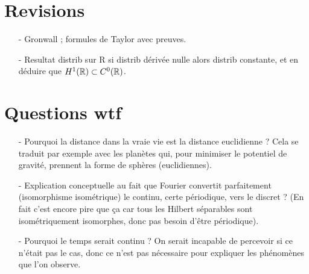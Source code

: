 \documentclass[11pt,a4paper]{article}
\begin{document}
\section{Revisions}
\begin{itemize}
\item[-] Gronwall ; formules de Taylor avec preuves.
\item[-] Resultat distrib sur R si distrib dérivée nulle alors distrib constante, et en déduire que $H^1(\mathbb R) \subset C^0(\mathbb R)$.
\end{itemize}

\section{Questions wtf}
\begin{itemize}
\item[-] Pourquoi la distance dans la vraie vie est la distance euclidienne ? Cela se traduit par exemple avec les planètes qui, pour minimiser le potentiel de gravité, prennent la forme de sphères (euclidiennes). \\
\item[-] Explication conceptuelle au fait que Fourier convertit parfaitement (isomorphisme isométrique) le continu, certe périodique, vers le discret ? (En fait c'est encore pire que ça car tous les Hilbert séparables sont isométriquement isomorphes, donc pas besoin d'être périodique).
\item[-] Pourquoi le temps serait continu ? On serait incapable de percevoir si ce n’était pas le cas, donc ce n’est pas nécessaire pour expliquer les phénomènes que l’on observe. 
\end{itemize}
\end{document}
